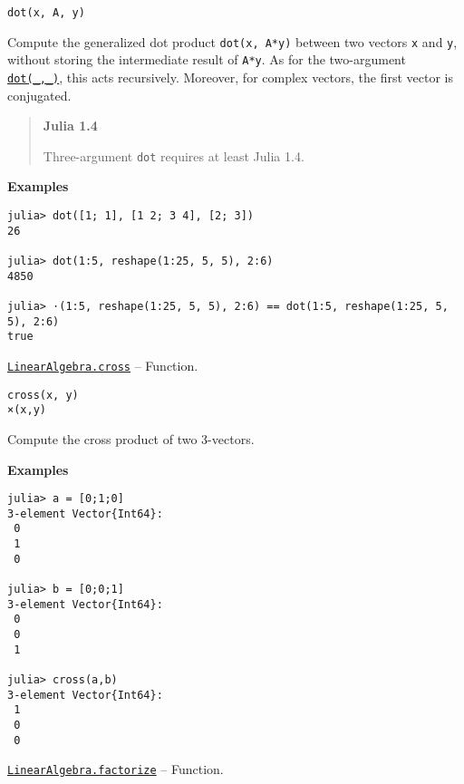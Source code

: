 \begin{adjustwidth}{2em}{0pt}


\begin{verbatim}
dot(x, A, y)
\end{verbatim}

Compute the generalized dot product \texttt{dot(x, A*y)} between two vectors \texttt{x} and \texttt{y}, without storing the intermediate result of \texttt{A*y}. As for the two-argument \hyperlink{15449777733236645501}{\texttt{dot(\_,\_)}}, this acts recursively. Moreover, for complex vectors, the first vector is conjugated.

\begin{quote}
\textbf{Julia 1.4}

Three-argument \texttt{dot} requires at least Julia 1.4.

\end{quote}
\textbf{Examples}


\begin{verbatim}
julia> dot([1; 1], [1 2; 3 4], [2; 3])
26

julia> dot(1:5, reshape(1:25, 5, 5), 2:6)
4850

julia> ⋅(1:5, reshape(1:25, 5, 5), 2:6) == dot(1:5, reshape(1:25, 5, 5), 2:6)
true
\end{verbatim}



\end{adjustwidth}
\hypertarget{7470245664307242183}{}
\hyperlink{7470245664307242183}{\texttt{LinearAlgebra.cross}}  -- {Function.}

\begin{adjustwidth}{2em}{0pt}


\begin{verbatim}
cross(x, y)
×(x,y)
\end{verbatim}

Compute the cross product of two 3-vectors.

\textbf{Examples}


\begin{verbatim}
julia> a = [0;1;0]
3-element Vector{Int64}:
 0
 1
 0

julia> b = [0;0;1]
3-element Vector{Int64}:
 0
 0
 1

julia> cross(a,b)
3-element Vector{Int64}:
 1
 0
 0
\end{verbatim}



\end{adjustwidth}
\hypertarget{7042962205548658937}{}
\hyperlink{7042962205548658937}{\texttt{LinearAlgebra.factorize}}  -- {Function.}

